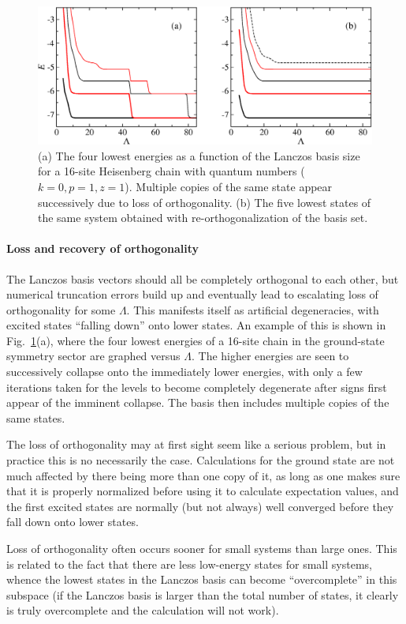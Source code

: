 \documentclass[draft,numberedheadings]{aipproc}
\begin{document}
\begin{figure}
\includegraphics[width=12.25cm, clip]{lancbreak.eps}
\caption{(a) The four lowest energies as a function of the Lanczos basis size for a 16-site Heisenberg chain with quantum numbers ($k=0,p=1,z=1$).
Multiple copies of the same state appear successively due to loss of orthogonality. (b) The five lowest states of the same system
obtained with re-orthogonalization of the basis set.}
\label{lancbreak}
\end{figure}

\paragraph{Loss and recovery of orthogonality}

The Lanczos basis vectors should all be completely orthogonal to each other, but numerical truncation errors build up and eventually lead to escalating 
loss of orthogonality for some $\Lambda$. This manifests itself as artificial degeneracies, with excited states ``falling down'' onto lower states. An 
example of this is shown in Fig.~\ref{lancbreak}(a), where the four lowest energies of a 16-site chain in the ground-state symmetry sector are graphed 
versus $\Lambda$. The higher energies are seen to successively collapse onto the immediately lower energies, with only a few iterations taken for the 
levels to become completely degenerate after signs first appear of the imminent collapse. The basis then includes multiple copies of the same states. 

The loss of orthogonality may at first sight seem like a serious problem, but in practice this is no necessarily the case. Calculations for 
the ground state are not much affected by there being more than one copy of it, as long as one makes sure that it is properly normalized before using it 
to calculate expectation values, and the first excited states are normally (but not always) well converged before they fall down onto lower states.

Loss of orthogonality often occurs sooner for small systems than large ones. This is related to the fact that there are less low-energy states for small 
systems, whence the lowest states in the Lanczos basis can become ``overcomplete'' in this subspace (if the Lanczos basis is larger than the total number 
of states, it clearly is truly overcomplete and the calculation will not work). 
\end{document}
